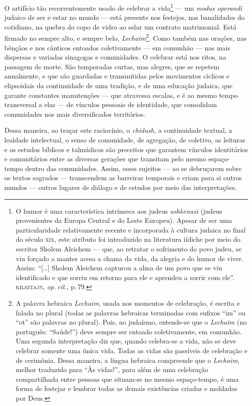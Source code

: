 O artifício tão recorrentemente usado de celebrar a vida\footnote{O
  humor é uma característica intrínseca aos judeus \emph{ashkenazi}
  (judeus provenientes da Europa Central e do Leste Europeu). Apesar de
  ser uma particularidade relativamente recente e incorporada à cultura
  judaica no final do século \textsc{xix}, este atributo foi introduzido na
  literatura iídiche por meio do escritor Sholem Aleichem ---
  que, ao retratar o sofrimento do povo judeu, se viu forçado a manter
  acesa a chama da vida, da alegria e do humor de viver. Assim:
  ``{[}\ldots{}{]} Sholem Aleichem capturou a alma de um povo que se
  viu identificado e que sorriu em retorno para ele e aprendeu a sorrir
  com ele''. \textsc{kilsztajn}, \emph{op.\,cit.}, p.\,79.} --- um \emph{modus operandi}
judaico de ser e estar no mundo --- está presente nos festejos, nas banalidades do cotidiano, na quebra do copo de vidro
ao selar um contrato matrimonial. Está firmado no sempre alto, e sempre
belo, \emph{Lechaim}\footnote{A palavra hebraica \emph{Lechaim}, usada
  nos momentos de celebração, é escrita e falada no plural (todas as
  palavras hebraicas terminadas com sufixos ``im'' ou ``ot'' são
  palavras no plural). Pois, no judaísmo, entende-se que o
  \emph{Lechaim} (no português: ``Saúde!'') deve sempre ser entoado
  coletivamente, em comunhão. Uma segunda interpretação diz que, quando
  celebra-se a vida, não se deve celebrar somente uma única vida. Todas
  as vidas são passíveis de celebração e de cerimônia. Dessa maneira, a
  língua hebraica compreende que o \emph{Lechaim}, melhor traduzido para
  ``Às vidas!'', para além de uma celebração compartilhada entre pessoas
  que situam-se no mesmo espaço-tempo, é uma forma de festejar e lembrar
  todas as demais existências criadas e moldadas por Deus.}. Como também
nas orações, nas bênçãos e nos cânticos entoados coletivamente --- em
comunhão --- nas mais dispersas e variadas sinagogas e comunidades. O
celebrar está nos ritos, na passagem de morte. São temporadas curtas,
mas alegres, que se repetem anualmente, e que são guardadas e
transmitidas pelos movimentos cíclicos e elipsoidais da continuidade de
uma tradição, e de uma educação judaica, que garante constantes
manutenções --- que atravessa escalas, e é ao mesmo tempo transversal a
elas --- de vínculos pessoais de identidade, que consolidam comunidades
nos mais diversificados territórios.

Dessa maneira, ao traçar este raciocínio, o \emph{chidush}, a
continuidade textual, a lealdade intelectual, o senso de comunidade, de
agregação, de coletivo, as leituras e os estudos bíblicos e
talmúdicos são preceitos que garantem vínculos identitários e
comunitários entre as diversas gerações que transitam pelo mesmo
espaço-tempo dentro das comunidades. Assim, esses sujeitos --- ao se
debruçarem sobre os textos sagrados --- transcendem as barreiras
temporais e criam para si outros mundos --- outros lugares de diálogo e
de estudos por meio das interpretações.

